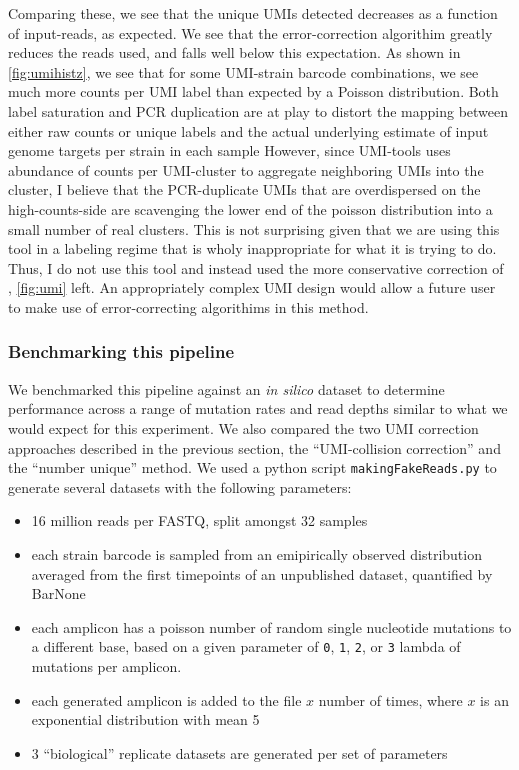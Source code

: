 Comparing these, we see that the unique UMIs detected decreases as a
function of input-reads, as expected. 
We see that the error-correction algorithim greatly reduces the reads
used, and falls well below this expectation. As shown in
\autoref{fig:umihistz}, we see that for some UMI-strain barcode
combinations, we see much more counts per UMI label than expected by a
Poisson distribution. 
Both label saturation and PCR duplication
are at play to distort the mapping between either raw counts or unique
labels and the actual underlying estimate of input genome targets per
strain in each sample
However, since UMI-tools uses abundance of counts per UMI-cluster
to aggregate neighboring UMIs into the cluster, I believe that the
PCR-duplicate UMIs that are overdispersed on the high-counts-side
are scavenging the lower end of the poisson distribution 
into a small number of real clusters. This is not
surprising given that we are using this tool in a labeling regime that
is wholy inappropriate for what it is trying to do. 
Thus, I do not use
this tool and instead used the more conservative 
correction of \cite{fu2011counting}, \autoref{fig:umi} left.
An appropriately complex UMI design would allow a future user to make
use of error-correcting algorithims in this method.

\subsubsection{Benchmarking this pipeline}

We benchmarked this pipeline against an \emph{in silico} dataset to
determine performance across a range of mutation rates and read depths
similar to what we would expect for this experiment. We also compared
the two UMI correction approaches described in the previous section, the
``UMI-collision correction'' and the ``number unique'' method. We used a
python script \texttt{makingFakeReads.py} to generate several datasets
with the following parameters:

\begin{itemize}
  \setlength\itemsep{0em}
  \item
  16 million reads per FASTQ, split amongst 32 samples
  \item
  each strain barcode is sampled from an emipirically observed
  distribution averaged from the first timepoints of an unpublished
  dataset, quantified by BarNone
  \item
  each amplicon has a poisson number of random single nucleotide
  mutations to a different base, based on a given parameter of
  \texttt{0}, \texttt{1}, \texttt{2}, or \texttt{3} lambda of mutations
  per amplicon.
  \item
  each generated amplicon is added to the file \(x\) number of times,
  where \(x\) is an exponential distribution with mean 5
  \item
  3 ``biological'' replicate datasets are generated per set of
  parameters
\end{itemize}


